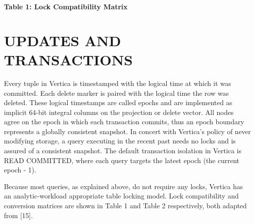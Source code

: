 \documentclass[a4paper,12pt,notitlepage,twoside,openright]{article}
\begin{document}
\textbf{Table 1: Lock Compatibility Matrix}


\hypertarget{updates-and-transactions}{%
\section{UPDATES AND TRANSACTIONS}\label{updates-and-transactions}}

Every tuple in Vertica is timestamped with the logical time at which it
was committed. Each delete marker is paired with the logical time the
row was deleted. These logical timestamps are called epochs and are
implemented as implicit 64-bit integral columns on the projection or
delete vector. All nodes agree on the epoch in which each transaction
commits, thus an epoch boundary represents a globally consistent
snapshot. In concert with Vertica's policy of never modifying storage, a
query executing in the recent past needs no locks and is assured of a
consistent snapshot. The default transaction isolation in Vertica is
READ COMMITTED, where each query targets the latest epoch (the current
epoch - 1).

Because most queries, as explained above, do not require any locks,
Vertica has an analytic-workload appropriate table locking model. Lock
compatibility and conversion matrices are shown in Table 1 and Table 2
respectively, both adapted from {[}15{]}.
\end{document}
